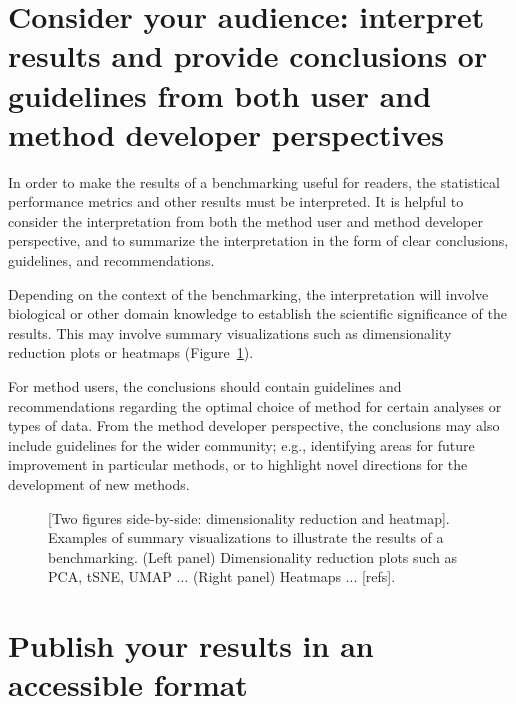 \documentclass[12pt, a4paper]{article}
\begin{document}
\section{Consider your audience: interpret results and provide conclusions or guidelines from both user and method developer perspectives}

In order to make the results of a benchmarking useful for readers, the statistical performance metrics and other results must be interpreted. It is helpful to consider the interpretation from both the method user and method developer perspective, and to summarize the interpretation in the form of clear conclusions, guidelines, and recommendations.

Depending on the context of the benchmarking, the interpretation will involve biological or other domain knowledge to establish the scientific significance of the results. This may involve summary visualizations such as dimensionality reduction plots or heatmaps (Figure~\ref{fig:summary_visualizations}).

For method users, the conclusions should contain guidelines and recommendations regarding the optimal choice of method for certain analyses or types of data. From the method developer perspective, the conclusions may also include guidelines for the wider community; e.g., identifying areas for future improvement in particular methods, or to highlight novel directions for the development of new methods.



\vskip 5mm

\begin{figure}[H]
\begin{center}
\end{center}
\caption{[Two figures side-by-side: dimensionality reduction and heatmap]. Examples of summary visualizations to illustrate the results of a benchmarking. (Left panel) Dimensionality reduction plots such as PCA, tSNE, UMAP ... (Right panel) Heatmaps ... [refs].}
\label{fig:summary_visualizations}
\end{figure}




\section{Publish your results in an accessible format}
\end{document}
